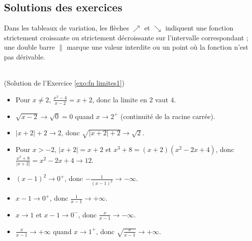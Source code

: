 \begin{corrige}
\section{Solutions des exercices}
Dans les tableaux de variation, les fl\`eches $\nearrow$ et $\searrow$ indiquent une fonction strictement croissante ou
strictement d\'ecroissante sur l'intervalle correspondant ; une double barre $\|$ marque une valeur interdite ou un point
o\`u la fonction n'est pas d\'erivable.

\begin{sol} ~ \\
(Solution de l'Exercice \ref{exo:fn limites1})
\begin{itemize}
\item Pour $x \neq 2$, $\frac{x^2-4}{x-2} = x + 2$, donc la limite en $2$ vaut $\boxed{4}$.
\item $\sqrt{x-2} \to \sqrt{0} = \boxed{0}$ quand $x \to 2^+$ (continuit\'e de la racine carr\'ee).
\item $|x + 2| + 2 \to 2$, donc $\sqrt{|x+2|+2} \to \boxed{\sqrt{2}}$.
\item Pour $x > -2$, $|x + 2| = x + 2$ et $x^3 + 8 = (x+2)(x^2 - 2x + 4)$, donc $\frac{x^3+8}{|x+2|} = x^2 - 2x + 4 \to \boxed{12}$.
\item $(x-1)^2 \to 0^+$, donc $-\frac{1}{(x-1)^2} \to \boxed{-\infty}$.
\item $x - 1 \to 0^+$, donc $\frac{1}{x-1} \to \boxed{+\infty}$.
\item $x \to 1$ et $x - 1 \to 0^-$, donc $\frac{x}{x-1} \to \boxed{-\infty}$.
\item $\frac{x}{x-1} \to +\infty$ quand $x \to 1^+$, donc $\sqrt{\frac{x}{x-1}} \to \boxed{+\infty}$.
\end{itemize}
\end{sol}


\end{corrige}
